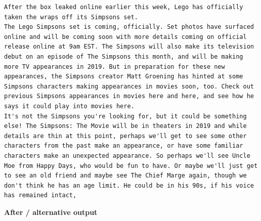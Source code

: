 \begin{Verbatim}
After the box leaked online earlier this week, Lego has officially taken the wraps off its Simpsons set.
The Lego Simpsons set is coming, officially. Set photos have surfaced online and will be coming soon with more details coming on official release online at 9am EST. The Simpsons will also make its television debut on an episode of The Simpsons this month, and will be making more TV appearances in 2019. But in preparation for these new appearances, the Simpsons creator Matt Groening has hinted at some Simpsons characters making appearances in movies soon, too. Check out previous Simpsons appearances in movies here and here, and see how he says it could play into movies here.
It's not the Simpsons you're looking for, but it could be something else! The Simpsons: The Movie will be in theaters in 2019 and while details are thin at this point, perhaps we'll get to see some other characters from the past make an appearance, or have some familiar characters make an unexpected appearance. So perhaps we'll see Uncle Moe from Happy Days, who would be fun to have. Or maybe we'll just get to see an old friend and maybe see The Chief Marge again, though we don't think he has an age limit. He could be in his 90s, if his voice has remained intact,
\end{Verbatim}

\textbf{After / alternative output}

